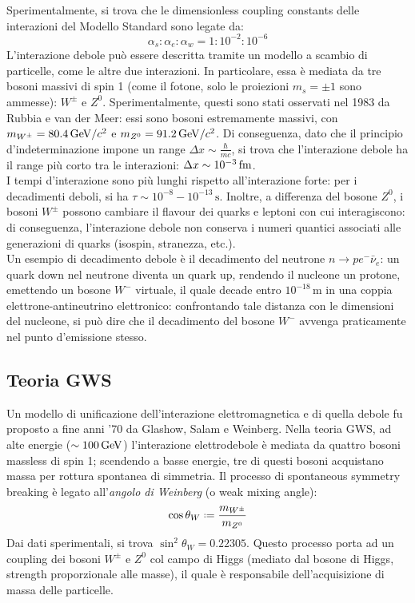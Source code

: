 Sperimentalmente, si trova che le dimensionless coupling constants delle interazioni del Modello Standard sono legate da:
\begin{equation}
	\alpha_s : \alpha_e : \alpha_w = 1 : 10^{-2} : 10^{-6}
	\label{eq:10.8454243}
\end{equation}
L'interazione debole può essere descritta tramite un modello a scambio di particelle, come le altre due interazioni. In particolare, essa è mediata da tre bosoni massivi di spin 1 (come il fotone, solo le proiezioni $ m_s = \pm 1 $ sono ammesse): $ W^{\pm} $ e $ Z^0 $. Sperimentalmente, questi sono stati osservati nel 1983 da Rubbia e van der Meer: essi sono bosoni estremamente massivi, con $ m_{W^{\pm}} = 80.4\,\mathrm{GeV}/c^2 $ e $ m_{Z^0} = 91.2\,\mathrm{GeV}/c^2 $. Di conseguenza, dato che il principio d'indeterminazione impone un range $ \Delta x \sim \frac{\hbar}{m c} $, si trova che l'interazione debole ha il range più corto tra le interazioni: $ \Delta x \sim 10^{-3} \,\mathrm{fm} $.\\
I tempi d'interazione sono più lunghi rispetto all'interazione forte: per i decadimenti deboli, si ha $ \tau \sim 10^{-8} - 10^{-13}\,\text{s} $. Inoltre, a differenza del bosone $ Z^0 $, i bosoni $ W^{\pm} $ possono cambiare il flavour dei quarks e leptoni con cui interagiscono: di conseguenza, l'interazione debole non conserva i numeri quantici associati alle generazioni di quarks (isospin, stranezza, etc.).\\
Un esempio di decadimento debole è il decadimento del neutrone $ n \rightarrow p e^- \bar{\nu}_e $: un quark down nel neutrone diventa un quark up, rendendo il nucleone un protone, emettendo un bosone $ W^- $ virtuale, il quale decade entro $ 10^{-18}\,\text{m} $ in una coppia elettrone-antineutrino elettronico: confrontando tale distanza con le dimensioni del nucleone, si può dire che il decadimento del bosone $ W^- $ avvenga praticamente nel punto d'emissione stesso.

\subsection{Teoria GWS}

Un modello di unificazione dell'interazione elettromagnetica e di quella debole fu proposto a fine anni '70 da Glashow, Salam e Weinberg. Nella teoria GWS, ad alte energie ($ \sim 100\,\mathrm{GeV} $) l'interazione elettrodebole è mediata da quattro bosoni massless di spin 1; scendendo a basse energie, tre di questi bosoni acquistano massa per rottura spontanea di simmetria. Il processo di spontaneous symmetry breaking è legato all'\textit{angolo di Weinberg} (o weak mixing angle):
\begin{equation}
	\cos \theta_W \defeq \frac{m_{W^{\pm}}}{m_{Z^0}}
	\label{eq:10.2315454}
\end{equation}
Dai dati sperimentali, si trova $ \sin^2 \theta_W = 0.22305 $. Questo processo porta ad un coupling dei bosoni $ W^{\pm} $ e $ Z^0 $ col campo di Higgs (mediato dal bosone di Higgs, strength proporzionale alle masse), il quale è responsabile dell'acquisizione di massa delle particelle.

